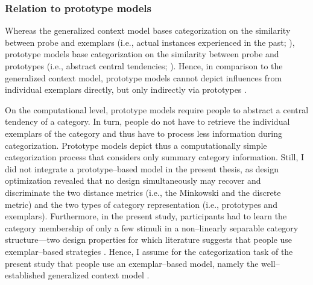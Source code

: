 \documentclass[a4paper,man,natbib]{apa6}
\begin{document}
\subsubsection{Relation to prototype models}
Whereas the generalized context model bases categorization on the similarity between probe and exemplars (i.e., actual instances experienced in the past; \citealp{medin1978context, nosofsky1986attention}), prototype models base categorization on the similarity between probe and prototypes (i.e., abstract central tendencies; \citealp{posner1968genesis}). Hence, in comparison to the generalized context model, prototype models cannot depict influences from individual exemplars directly, but only indirectly via prototypes \citep{nosofsky2011generalized, nosofsky1992exemplars, medin1978context}.

On the computational level, prototype models require people to abstract a central tendency of a category. In turn, people do not have to retrieve the individual exemplars of the category and thus have to process less information during categorization. Prototype models depict thus a computationally simple categorization process that considers only summary category information.
Still, I did not integrate a prototype--based model in the present thesis, as design optimization revealed that no design simultaneously may recover and discriminate the two distance metrics (i.e., the Minkowski and the discrete metric) and the two types of category representation (i.e., prototypes and exemplars). Furthermore, in the present study, participants had to learn the category membership of only a few stimuli in a non--linearly separable category structure---two design properties for which literature suggests that people use exemplar--based strategies \citep{smith1998prototypes, smith2000thirty}. Hence, I assume for the categorization task of the present study that people use an exemplar--based model, namely the well--established generalized context model \citep{nosofsky1986attention}.
\end{document}

